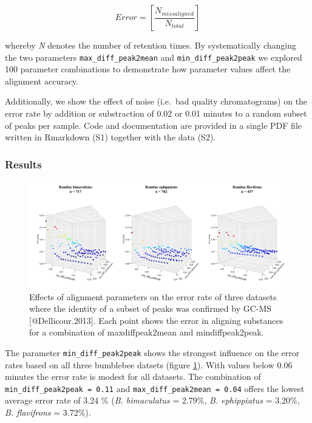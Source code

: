 \begin{equation}
Error = \left[\frac{N_{missaligned}}{N_{total}}\right] 
\end{equation}

whereby \emph{N} denotes the number of retention times. By
systematically changing the two parameters \texttt{max\_diff\_peak2mean}
and \texttt{min\_diff\_peak2peak} we explored 100 parameter combinations
to demonstrate how parameter values affect the alignment accuracy. \par
Additionally, we show the effect of noise (i.e.~bad quality
chromatograms) on the error rate by addition or substraction of 0.02 or
0.01 minutes to a random subset of peaks per sample. Code and
documentation are provided in a single PDF file written in Rmarkdown
(S1) together with the data (S2).

\subsubsection{Results}\label{results}

\begin{figure}[htbp]
\centering
\includegraphics[width=13cm]{figures/parameter_space}
\caption{Effects of alignment parameters on the error rate of three datasets where the identity of a subset of peaks was confirmed by GC-MS [@Dellicour.2013]. Each point shows the error in aligning substances for a combination of max\textunderscore diff\textunderscore peak2mean and min\textunderscore diff\textunderscore peak2peak.}
\label{figure:parameterspace}
\end{figure}

The parameter \texttt{min\_diff\_peak2peak} shows the strongest
influence on the error rates based on all three bumblebee datsets
(figure \ref{figure:parameterspace}). With values below 0.06 minutes the
error rate is modest for all datasets. The combination of
\texttt{min\_diff\_peak2peak\ =\ 0.11} and
\texttt{max\_diff\_peak2mean\ =\ 0.04} offers the lowest average error
rate of 3.24 \% (\emph{B. bimaculatus} = 2.79\%, \emph{B. ephippiatus} =
3.20\%, \emph{B. flavifrons} = 3.72\%). \par

